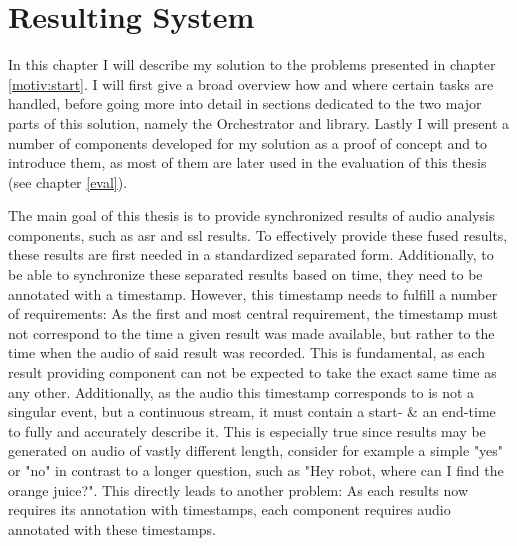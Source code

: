 \chapter{Resulting System}
\label{main:main}
In this chapter I will describe my solution to the problems presented in chapter \ref{motiv:start}.
I will first give a broad overview how and where certain tasks are handled, before going more into detail in sections dedicated to the two major parts of this solution, namely the Orchestrator and library.
Lastly I will present a number of components developed for my solution as a proof of concept and to introduce them, as most of them are later used in the evaluation of this thesis (see chapter \ref{eval}).

The main goal of this thesis is to provide synchronized results of audio analysis components, such as \gls{asr} and \gls{ssl} results.
To effectively provide these fused results, these results are first needed in a standardized separated form.
Additionally, to be able to synchronize these separated results based on time, they need to be annotated with a timestamp.
However, this timestamp needs to fulfill a number of requirements:
As the first and most central requirement, the timestamp must not correspond to the time a given result was made available, but rather to the time when the audio of said result was recorded.
This is fundamental, as each result providing component can not be expected to take the exact same time as any other.
Additionally, as the audio this timestamp corresponds to is not a singular event, but a continuous stream, it must contain a start- \& an end-time to fully and accurately describe it.
This is especially true since results may be generated on audio of vastly different length, consider for example a simple "yes" or "no" in contrast to a longer question, such as "Hey robot, where can I find the orange juice?".
This directly leads to another problem:
As each results now requires its annotation with timestamps, each component requires audio annotated with these timestamps.

